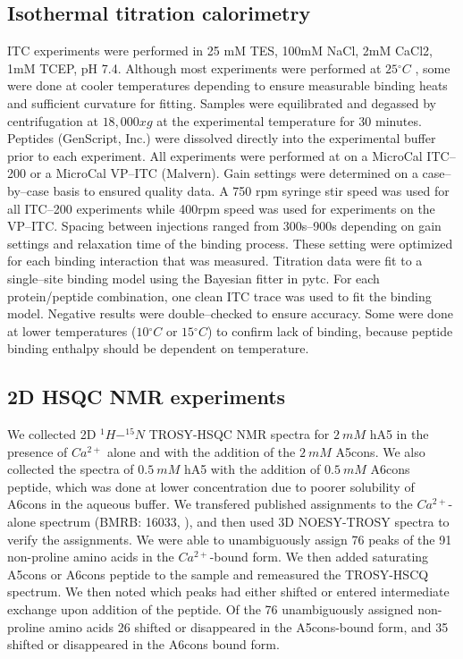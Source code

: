 \subsection{Isothermal titration calorimetry}

ITC experiments were performed in 25 mM TES, 100mM NaCl, 2mM CaCl2,
1mM TCEP, pH 7.4. Although most experiments were performed at $25{^\circ}C$
, some were done at cooler temperatures depending to ensure measurable
binding heats and sufficient curvature for fitting. Samples were equilibrated
and degassed by centrifugation at $18,000xg$ at the experimental
temperature for 30 minutes. Peptides (GenScript, Inc.) were dissolved
directly into the experimental buffer prior to each experiment. All
experiments were performed at on a MicroCal ITC--200 or a MicroCal
VP--ITC (Malvern). Gain settings were determined on a case--by--case
basis to ensured quality data. A 750 rpm syringe stir speed was used
for all ITC--200 experiments while 400rpm speed was used for experiments
on the VP--ITC. Spacing between injections ranged from 300s--900s depending
on gain settings and relaxation time of the binding process. These
setting were optimized for each binding interaction that was measured.
Titration data were fit to a single--site binding model using the Bayesian
fitter in pytc. For each protein/peptide combination, one clean ITC
trace was used to fit the binding model. Negative results were double--checked
to ensure accuracy. Some were done at lower temperatures ($10{^\circ}C$
or $15{^\circ}C$) to confirm lack of binding, because peptide binding
enthalpy should be dependent on temperature. 

\subsection{2D HSQC NMR experiments}

We collected 2D $^{1}H-^{15}N$ TROSY-HSQC NMR spectra for $2\ mM$
hA5 in the presence of $Ca^{2+}$ alone and with the addition of the
$2\ mM$ A5cons. We also collected the spectra of $0.5\ mM$ hA5 with
the addition of $0.5\ mM$ A6cons peptide, which was done at lower
concentration due to poorer solubility of A6cons in the aqueous buffer.
We transfered published assignments to the $Ca^{2+}$-alone spectrum
(BMRB: 16033, \citep{bertini_solution_2009}), and then used 3D NOESY-TROSY
spectra to verify the assignments. We were able to unambiguously assign
76 peaks of the 91 non-proline amino acids in the $Ca^{2+}$-bound
form. We then added saturating A5cons or A6cons peptide to the sample
and remeasured the TROSY-HSCQ spectrum. We then noted which peaks
had either shifted or entered intermediate exchange upon addition
of the peptide. Of the 76 unambiguously assigned non-proline amino
acids 26 shifted or disappeared in the A5cons-bound form, and 35 shifted
or disappeared in the A6cons bound form.

